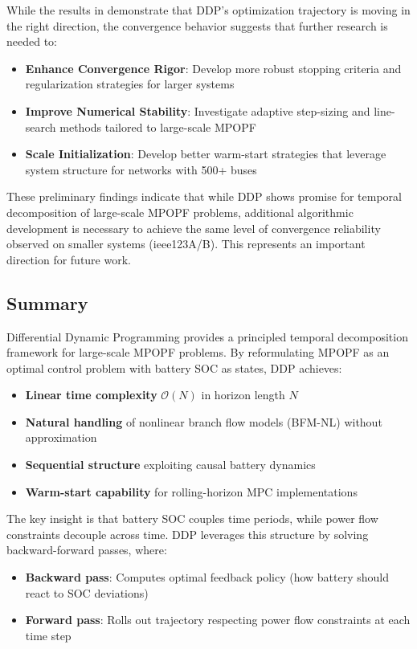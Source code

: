 While the results in  demonstrate that DDP's optimization trajectory is moving in the right direction, the convergence behavior suggests that further research is needed to:
\begin{itemize}
    \item \textbf{Enhance Convergence Rigor}: Develop more robust stopping criteria and regularization strategies for larger systems
    \item \textbf{Improve Numerical Stability}: Investigate adaptive step-sizing and line-search methods tailored to large-scale MPOPF
    \item \textbf{Scale Initialization}: Develop better warm-start strategies that leverage system structure for networks with 500+ buses
\end{itemize}

These preliminary findings indicate that while DDP shows promise for temporal decomposition of large-scale MPOPF problems, additional algorithmic development is necessary to achieve the same level of convergence reliability observed on smaller systems (ieee123A/B). This represents an important direction for future work.

\subsection{Summary}

Differential Dynamic Programming provides a principled temporal decomposition framework for large-scale MPOPF problems. By reformulating MPOPF as an optimal control problem with battery SOC as states, DDP achieves:

\begin{itemize}
    \item \textbf{Linear time complexity} $\mathcal{O}(N)$ in horizon length $N$
    \item \textbf{Natural handling} of nonlinear branch flow models (BFM-NL) without approximation
    \item \textbf{Sequential structure} exploiting causal battery dynamics
    \item \textbf{Warm-start capability} for rolling-horizon MPC implementations
\end{itemize}

The key insight is that battery SOC couples time periods, while power flow constraints decouple across time. DDP leverages this structure by solving backward-forward passes, where:
\begin{itemize}
    \item \textbf{Backward pass}: Computes optimal feedback policy (how battery should react to SOC deviations)
    \item \textbf{Forward pass}: Rolls out trajectory respecting power flow constraints at each time step
\end{itemize}

